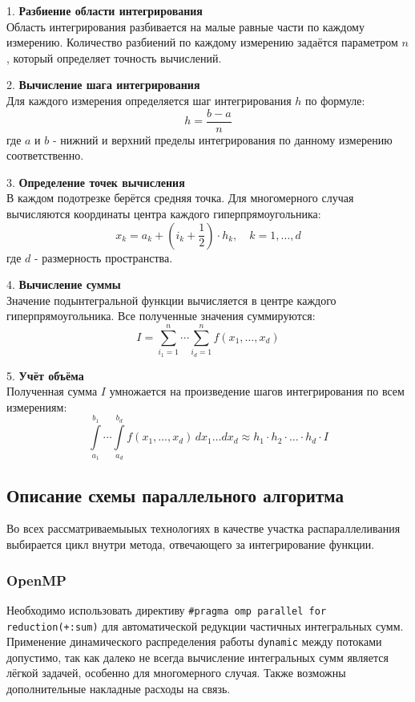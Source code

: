 \documentclass[14pt,a4paper]{article}
\begin{document}
\begin{flushleft}
1. \textbf{Разбиение области интегрирования} \\
Область интегрирования разбивается на малые равные части по каждому измерению. Количество разбиений по каждому измерению задаётся параметром $n$, который определяет точность вычислений.

2. \textbf{Вычисление шага интегрирования} \\
Для каждого измерения определяется шаг интегрирования $h$ по формуле:
\[ h = \frac{b - a}{n} \]
где $a$ и $b$ - нижний и верхний пределы интегрирования по данному измерению соответственно.

3. \textbf{Определение точек вычисления} \\
В каждом подотрезке берётся средняя точка. Для многомерного случая вычисляются координаты центра каждого гиперпрямоугольника:
\[ x_k = a_k + \left(i_k + \frac{1}{2}\right) \cdot h_k, \quad k = 1,\ldots,d \]
где $d$ - размерность пространства.

4. \textbf{Вычисление суммы} \\
Значение подынтегральной функции вычисляется в центре каждого гиперпрямоугольника. Все полученные значения суммируются:
\[ I = \sum_{i_1=1}^n \cdots \sum_{i_d=1}^n f(x_1,\ldots,x_d) \]

5. \textbf{Учёт объёма} \\
Полученная сумма $I$ умножается на произведение шагов интегрирования по всем измерениям:
\[ \int\limits_{a_1}^{b_1} \cdots \int\limits_{a_d}^{b_d} f(x_1,\ldots,x_d) \,dx_1 \ldots dx_d \approx h_1 \cdot h_2 \cdot \ldots \cdot h_d \cdot I \]
\end{flushleft}

\subsection{Описание схемы параллельного алгоритма}
Во всех рассматриваемыыых технологиях в качестве участка распараллеливания выбирается
цикл внутри метода, отвечающего за интегрирование функции. 
\subsubsection{OpenMP}
Необходимо использовать директиву \texttt{\#pragma omp parallel for reduction(+:sum)}
 для автоматической редукции частичных интегральных сумм.
 Применение динамического распределения работы \texttt{dynamic}  между потоками допустимо,
 так как далеко не всегда вычисление интегральных сумм является лёгкой задачей,
 особенно для многомерного случая. Также возможны дополнительные накладные расходы на связь.
\end{document}
